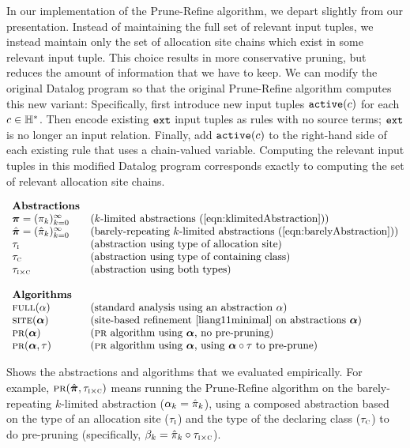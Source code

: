 In our implementation of the Prune-Refine algorithm, we depart slightly from our
presentation.  Instead of maintaining the full set of relevant input tuples, we instead
maintain only the set of allocation site chains which exist in some relevant input
tuple.  This choice results in more conservative pruning, but reduces the
amount of information that we have to keep.
We can modify the original Datalog program so that the original Prune-Refine algorithm
computes this new variant: Specifically, first introduce new input tuples
$\text{\tt active}(c)$ for each $c \in {\mathbb H}^*$.   Then encode existing $\text{\tt ext}$ input tuples as rules
with no source terms; $\text{\tt ext}$ is no longer an input relation.  Finally, add $\text{\tt active}(c)$ to the right-hand side of each existing
rule that uses a chain-valued variable.  Computing the
relevant input tuples in this modified Datalog program corresponds exactly to
computing the set of relevant allocation site chains.

\begin{table}
\[
\begin{array}{ll}
\text{\bf Abstractions} \\
\Klimabs = (\klimabs_k)_{k=0}^\infty   & \defn{$k$-limited abstractions \refeqn{klimitedAbstraction}} \\
\Klimdabs = (\klimdabs_k)_{k=0}^\infty & \defn{barely-repeating $k$-limited abstractions \refeqn{barelyAbstraction}} \\
\hclassIs                              & \defn{abstraction using type of allocation site} \\
\hclassHas                             & \defn{abstraction using type of containing class} \\
\hclassIsHas                           & \defn{abstraction using both types} \\
\\
\text{\bf Algorithms} \\
\Full(\alpha)         & \defn{standard analysis using an abstraction $\alpha$} \\
\Site(\balpha)        & \defn{site-based refinement \cite{liang11minimal} on abstractions $\balpha$} \\
\PR(\balpha)          & \defn{\PR\ algorithm using $\balpha$, no pre-pruning} \\
\PR(\balpha,\hclass)  & \defn{\PR\ algorithm using $\balpha$, using $\balpha\circ\hclass$ to pre-prune} \\
\end{array}
\]
\caption{\label{tab:algorithms} Shows the abstractions and algorithms that we evaluated empirically.
For example,
$\text{\sc pr}(\hat{\mbox{\boldmath$\pi$}},\tau_{\text{\sc i} \times \text{\sc c}})$
means running the Prune-Refine algorithm on the barely-repeating $k$-limited abstraction ($\alpha_k = \hat{\pi}_k$),
using a composed abstraction based on the type of an allocation site ($\tau_{\text{\sc i}}$) 
and the type of the declaring class ($\tau_{\text{\sc c}}$) to do pre-pruning
(specifically, $\beta_k = \hat{\pi}_k \circ \tau_{\text{\sc i} \times \text{\sc c}}$).
}
\end{table}

